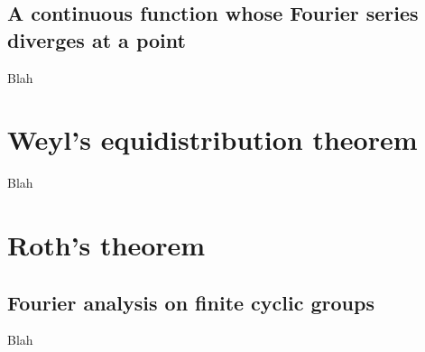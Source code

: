 \documentclass[12pt, titlepage]{article}
\theoremstyle{definition}
\begin{document}
\subsection{A continuous function whose Fourier series diverges at a point}
Blah

\newpage

\section{Weyl's equidistribution theorem}
Blah

\newpage

\section{Roth's theorem}

\subsection{Fourier analysis on finite cyclic groups}
Blah

\newpage




\end{document}
